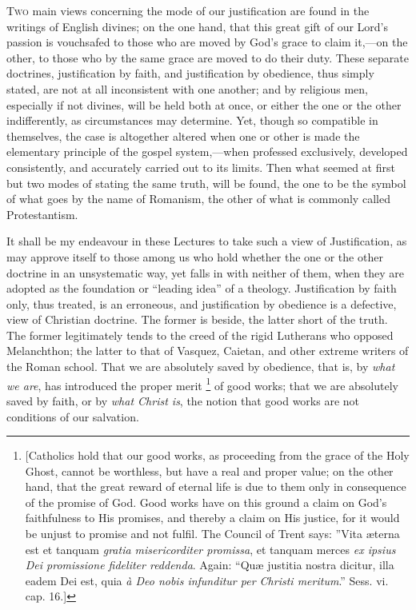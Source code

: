T\textsc{wo} main views concerning the mode of our justification are
found in the writings of English divines; on the one hand, that this
great gift of our Lord's passion is vouchsafed to those who are moved
by God's grace to claim it,—on the other, to those who by the same
grace are moved to do their duty. These separate doctrines,
justification by faith, and justification by obedience, thus simply
stated, are not at all inconsistent with one another; and by religious
men, especially if not divines, will be held both at once, or either
the one or the other indifferently, as circumstances may determine.
Yet, though so compatible in themselves, the case is altogether
altered when one or other is made the elementary principle of the
gospel system,—when professed exclusively, developed consistently,
and accurately carried out to its limits. Then what seemed at first
but two modes of stating the same truth, will be found, the one to be
the symbol of what goes by the name of Romanism, the other of what is
commonly called Protestantism.

It shall be my endeavour in these Lectures to take such a view of
Justification, as may approve itself to those among us who hold
whether the one or the other doctrine in an unsystematic way, yet
falls in with neither of them, when they are adopted as the foundation
or ``leading idea'' of a theology. Justification by faith
only, thus treated, is an erroneous, and justification by obedience is
a defective, view of Christian doctrine. The former is beside, the
latter short of the truth. The former legitimately tends to the creed
of the rigid Lutherans who opposed Melanchthon; the latter to that of
Vasquez, Caietan, and other extreme writers of the Roman school. That
we are absolutely saved by obedience, that is, by \emph{what we are},
has introduced the proper merit \footnote{[Catholics hold that our good works, as proceeding from the
grace of the Holy Ghost, cannot be worthless, but have a real and
proper value; on the other hand, that the great reward of eternal life
is due to them only in consequence of the promise of God. Good works
have on this ground a claim on God's faithfulness to His promises, and
thereby a claim on His justice, for it would be unjust to promise and
not fulfil. The Council of Trent says: ''Vita æterna est et tanquam \emph{gratia
misericorditer promissa}, et tanquam merces \emph{ex ipsius Dei
promissione fideliter reddenda}. Again: ``Quæ justitia nostra
dicitur, illa eadem Dei est, quia \emph{à Deo nobis infunditur per Christi
meritum}.'' Sess. vi. cap. 16.]} of good works; that we are
absolutely saved by faith, or by \emph{what Christ is}, the notion
that good works are not conditions of our salvation.

